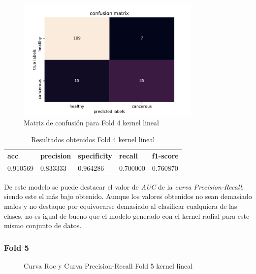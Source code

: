 \begin{figure}[H]
	\centering
	\includegraphics[width=90mm]{imagenes/confusion_mat4_gpflow_linear}
	\caption{Matriz de confusión para Fold 4 kernel lineal}
	\label{fig:conf4_lin}
\end{figure}

\begin{table}[H]
	\centering
	\begin{tabular}{lllll}
		\textbf{acc} & \textbf{precision} & \textbf{specificity} & \textbf{recall} & \textbf{f1-score} \\
		0.910569     & 0.833333           & 0.964286             & 0.700000        & 0.760870         \\
	\end{tabular}
	\caption{Resultados obtenidos Fold 4 kernel lineal}
	\label{table:9}
\end{table}

De este modelo se puede destacar el valor de \textit{AUC} de la \textit{curva Precision-Recall}, siendo este el más bajo obtenido. Aunque los valores obtenidos no sean demasiado malos y no destaque por equivocarse demasiado al clasificar cualquiera de las clases, no es igual de bueno que el modelo generado con el kernel radial para este mismo conjunto de datos.
\subsubsection{Fold 5}

\begin{figure}[H]
	\centering
	\caption{Curva Roc y Curva Precision-Recall Fold 5 kernel lineal}
	\label{fig:resultados5_linear}
\end{figure}

